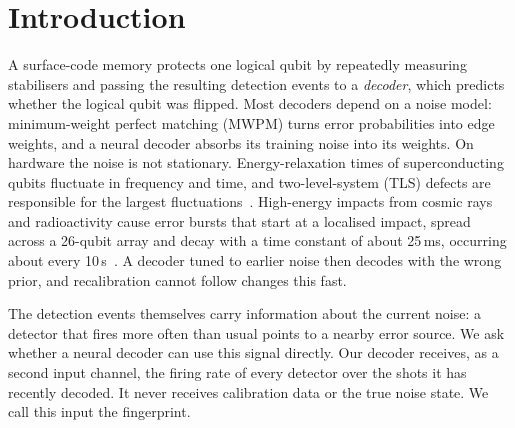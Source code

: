 \documentclass[11pt,a4paper]{article}
\begin{document}
\section{Introduction}\label{sec:intro}

A surface-code memory protects one logical qubit by repeatedly measuring stabilisers and passing the resulting
detection events to a \emph{decoder}, which predicts whether the logical qubit was flipped. Most decoders depend
on a noise model: minimum-weight perfect matching (MWPM) turns error probabilities into edge weights, and a
neural decoder absorbs its training noise into its weights. On hardware the noise is not stationary. Energy-relaxation
times of superconducting qubits fluctuate in frequency and time, and two-level-system (TLS) defects are responsible
for the largest fluctuations~\cite{klimov2018fluctuations}. High-energy impacts from cosmic rays and radioactivity
cause error bursts that start at a localised impact, spread across a 26-qubit array and decay with a time constant
of about 25\,ms, occurring about every 10\,s~\cite{mcewen2022cosmic}. A decoder tuned to earlier noise then decodes
with the wrong prior, and recalibration cannot follow changes this fast.

The detection events themselves carry information about the current noise: a detector that fires more often
than usual points to a nearby error source. We ask whether a neural decoder can use this signal directly. Our
decoder receives, as a second input channel, the firing rate of every detector over the shots it has recently
decoded. It never receives calibration data or the true noise state. We call this input the fingerprint.
\end{document}
